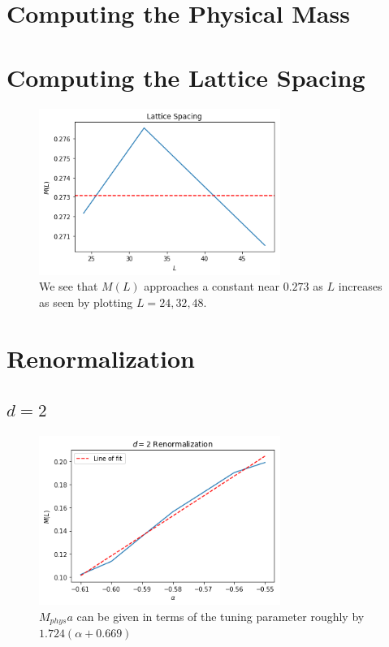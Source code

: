 \documentclass[12]{report}
\newcommand\0{\mathbf{0}}
\newcommand\<{\langle}
\renewcommand\>{\rangle}
\begin{document}
\section{Computing the Physical Mass}

\section{Computing the Lattice Spacing}

\begin{figure}[H]
\centering
\includegraphics[width=0.7\textwidth]{lattice_spacing.png}
\caption{We see that $M(L)$ approaches a constant near $0.273$ as $L$ increases as seen by plotting $L = 24, 32, 48$.}	
\end{figure}


\section{Renormalization}

\subsection{$d=2$}

\begin{figure}[H]
\centering
\includegraphics[width=0.7\textwidth]{renormalization_2}
\caption{$M_{phys}a$ can be given in terms of the tuning parameter roughly by $1.724(\alpha + 0.669)$}	
\end{figure}
\end{document}
